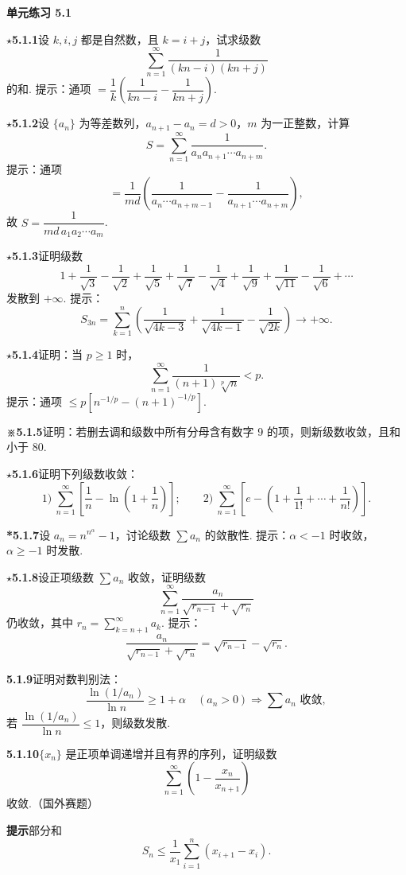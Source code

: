 \documentclass[UTF8, 12pt, fontset=fandol, oneside]{ctexart}
\begin{document}
\noindent\textbf{单元练习 5.1}

\noindent\textbf{$\star$5.1.1}\quad 设 $k,i,j$ 都是自然数，且 $k=i+j$，试求级数
\[
  \sum_{n=1}^{\infty}\frac1{(kn-i)(kn+j)}
\]
的和. 提示：通项 $=\dfrac1k\left(\dfrac1{kn-i}-\dfrac1{kn+j}\right)$.

\noindent\textbf{$\star$5.1.2}\quad 设 $\{a_n\}$ 为等差数列，$a_{n+1}-a_n=d>0$，$m$ 为一正整数，计算
\[
  S=\sum_{n=1}^{\infty}\frac1{a_n a_{n+1}\cdots a_{n+m}}.
\]
提示：通项
\[
  =\frac1{md}\left(\frac1{a_n\cdots a_{n+m-1}}-\frac1{a_{n+1}\cdots a_{n+m}}\right),
\]
故 $S=\dfrac1{md\,a_1a_2\cdots a_m}$.

\noindent\textbf{$\star$5.1.3}\quad 证明级数
\[
  1+\frac1{\sqrt3}-\frac1{\sqrt2}+\frac1{\sqrt5}+\frac1{\sqrt7}
  -\frac1{\sqrt4}+\frac1{\sqrt9}+\frac1{\sqrt{11}}-\frac1{\sqrt6}+\cdots
\]
发散到 $+\infty$. 提示：
\[
  S_{3n}=\sum_{k=1}^n\left(\frac1{\sqrt{4k-3}}+\frac1{\sqrt{4k-1}}-\frac1{\sqrt{2k}}\right)\to+\infty.
\]

\noindent\textbf{$\star$5.1.4}\quad 证明：当 $p\ge1$ 时，
\[
  \sum_{n=1}^{\infty}\frac1{(n+1)\sqrt[p]{n}}<p.
\]
提示：通项 $\le p[n^{-1/p}-(n+1)^{-1/p}]$.

\noindent\textbf{※5.1.5}\quad 证明：若删去调和级数中所有分母含有数字 9 的项，则新级数收敛，且和小于 80.

\noindent\textbf{$\star$5.1.6}\quad 证明下列级数收敛：
\[
  1)\ \sum_{n=1}^{\infty}\left[\frac1n-\ln\left(1+\frac1n\right)\right];
  \qquad
  2)\ \sum_{n=1}^{\infty}\left[e-\left(1+\frac1{1!}+\cdots+\frac1{n!}\right)\right].
\]

\noindent\textbf{*5.1.7}\quad 设 $a_n=n^{n^\alpha}-1$，讨论级数 $\displaystyle\sum a_n$ 的敛散性. 提示：$\alpha<-1$ 时收敛，$\alpha\ge-1$ 时发散.

\noindent\textbf{$\star$5.1.8}\quad 设正项级数 $\displaystyle\sum a_n$ 收敛，证明级数
\[
  \sum_{n=1}^{\infty}\frac{a_n}{\sqrt{r_{n-1}}+\sqrt{r_n}}
\]
仍收敛，其中 $r_n=\displaystyle\sum_{k=n+1}^{\infty}a_k$. 提示：
\[
  \frac{a_n}{\sqrt{r_{n-1}}+\sqrt{r_n}}=\sqrt{r_{n-1}}-\sqrt{r_n}.
\]

\noindent\textbf{5.1.9}\quad 证明对数判别法：
\[
  \frac{\ln(1/a_n)}{\ln n}\ge1+\alpha\quad(a_n>0)
  \Rightarrow \sum a_n\text{ 收敛},
\]
若 $\dfrac{\ln(1/a_n)}{\ln n}\le1$，则级数发散.

\noindent\textbf{5.1.10}\quad $\{x_n\}$ 是正项单调递增并且有界的序列，证明级数
\[
  \sum_{n=1}^{\infty}\left(1-\frac{x_n}{x_{n+1}}\right)
\]
收敛.（国外赛题）

\noindent\textbf{提示}\quad 部分和
\[
  S_n\le \frac1{x_1}\sum_{i=1}^n(x_{i+1}-x_i).
\]
\end{document}
